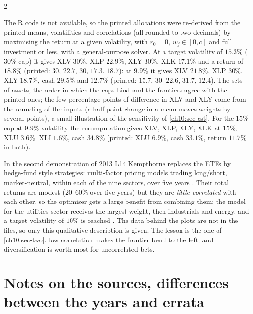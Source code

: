 \begin{paracol}{2}
\begin{coursenote}
The R code is not available, so the printed allocations were re-derived from the printed means, volatilities and
correlations (all rounded to two decimals) by maximising the return at a given volatility, with $r_0=0$,
$w_j\in[0,c]$ and full investment or less, with a general-purpose solver. At a target volatility of $15.3\%$ ($30\%$ cap) it gives XLV $30\%$, XLP $22.9\%$, XLY $30\%$,
XLK $17.1\%$ and a return of $18.8\%$ (printed: $30$, $22.7$, $30$, $17.3$, $18.7$); at $9.9\%$ it gives XLV $21.8\%$, XLP $30\%$, XLY $18.7\%$,
cash $29.5\%$ and $12.7\%$ (printed: $15.7$, $30$, $22.6$, $31.7$, $12.4$). The sets of assets, the order in which the caps bind
and the frontiers agree with the printed ones; the few percentage points of difference in XLV and XLY
come from the rounding of the inputs (a half-point change in a mean moves weights by several points), a small illustration of the sensitivity of \cref{ch10:sec-est}. For the $15\%$ cap at $9.9\%$ volatility the recomputation gives XLV, XLP, XLY, XLK at $15\%$,
XLU $3.6\%$, XLI $1.6\%$, cash $34.8\%$ (printed: XLU $6.9\%$, cash $33.1\%$, return $11.7\%$ in both).
\end{coursenote}

\begin{finance}
In the second demonstration of 2013 L14 Kempthorne replaces the ETFs by hedge-fund style strategies: multi-factor pricing
models trading long/short, market-neutral, within each of the nine sectors, over five years
. Their total returns are modest ($20$--$60\%$ over five years) but they are
\emph{little correlated} with each other, so the optimiser gets a large benefit from combining them; the model for the utilities sector
receives the largest weight, then industrials and energy, and a target volatility of $10\%$ is reached .
The data behind the plots are not in the files, so only this qualitative description is given. The lesson is the one
of \cref{ch10:sec-two}: low correlation makes the frontier bend to the left, and diversification is worth most for
uncorrelated bets.
\end{finance}

\section{Notes on the sources, differences between the years and errata}\label{ch10:sec-notes}


\end{paracol}
